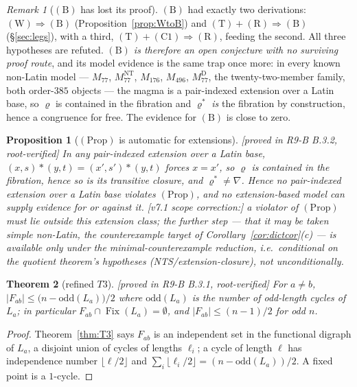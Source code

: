 \documentclass[11pt]{article}
\theoremstyle{plain}
\newtheorem{theorem}{Theorem}[section]
\newtheorem{proposition}[theorem]{Proposition}
\theoremstyle{definition}
\theoremstyle{remark}
\newtheorem*{remark*}{Remark}
\numberwithin{equation}{section}
\newcommand{\op}{\mathbin{*}}
\newcommand{\Fix}{\operatorname{Fix}}
\newcommand{\statusbox}[1]{{\small\sloppy\textsf{[#1]}}}
\newcommand{\MV}[1]{\statusbox{machine-verified: \texttt{#1}}}
\newcommand{\PROVED}[1]{\statusbox{proved in #1, root-verified}}
\begin{document}
\begin{remark*}[$(\mathrm{B})$ has lost its proof]
$(\mathrm{B})$ had exactly two derivations: $(\mathrm{W})\Rightarrow(\mathrm{B})$
(Proposition~\ref{prop:WtoB}) and
$(\mathrm{T})+(\mathrm{R})\Rightarrow(\mathrm{B})$ (\S\ref{sec:legs}), with a
third, $(\mathrm{T})+(\mathrm{C1})\Rightarrow(\mathrm{R})$, feeding the second.
All three hypotheses are refuted. \emph{$(\mathrm{B})$ is therefore an open
conjecture with no surviving proof route}, and its model evidence is the same trap
once more: in every known non-Latin model --- $M_{77}$, $M_{77}^{\mathrm{NT}}$,
$M_{176}$, $M_{496}$, $M_{77}^{\mathrm{D}}$, the twenty-two-member family, both
order-$385$ objects --- the magma is a pair-indexed extension over a Latin base,
so $\varrho$ is contained in the fibration and $\varrho^{*}$ \emph{is} the
fibration by construction, hence a congruence for free. The evidence for
$(\mathrm{B})$ is close to zero.
\end{remark*}

\begin{proposition}[$(\mathrm{Prop})$ is automatic for extensions]\label{prop:propauto}
\PROVED{R9-B B.3.2}
In any pair-indexed extension over a Latin base, $(x,s)\op(y,t) = (x',s')\op(y,t)$
forces $x = x'$, so $\varrho$ is contained in the fibration, hence so is its
transitive closure, and $\varrho^{*}\ne\nabla$. Hence no pair-indexed extension
over a Latin base violates $(\mathrm{Prop})$, and \emph{no extension-based model
can supply evidence for or against it}. [v7.1 scope correction:] a violator of
$(\mathrm{Prop})$ must lie \emph{outside} this extension class; the further step
--- that it may be taken \emph{simple} non-Latin, the counterexample target of
Corollary~\ref{cor:dictcor}(c) --- is available only under the
minimal-counterexample reduction, i.e.\ conditional on the quotient theorem's
hypotheses (NTS/extension-closure), not unconditionally.
\end{proposition}

\begin{theorem}[refined $T3$]\label{thm:T3refined}
\PROVED{R9-B B.3.1}\;\MV{problems\slash etp677\slash R9\_audit.py}
For $a\ne b$, $|F_{ab}|\le\bigl(n-\mathrm{odd}(L_a)\bigr)/2$ where
$\mathrm{odd}(L_a)$ is the number of odd-length cycles of $L_a$; in particular
$F_{ab}\cap\Fix(L_a) = \emptyset$, and $|F_{ab}|\le(n-1)/2$ for odd $n$.
\end{theorem}

\begin{proof}
Theorem~\ref{thm:T3} says $F_{ab}$ is an independent set in the functional digraph
of $L_a$, a disjoint union of cycles of lengths $\ell_i$; a cycle of length $\ell$
has independence number $\lfloor\ell/2\rfloor$ and
$\sum_i\lfloor\ell_i/2\rfloor = (n-\mathrm{odd}(L_a))/2$. A fixed point is a
$1$-cycle.
\end{proof}
\end{document}
